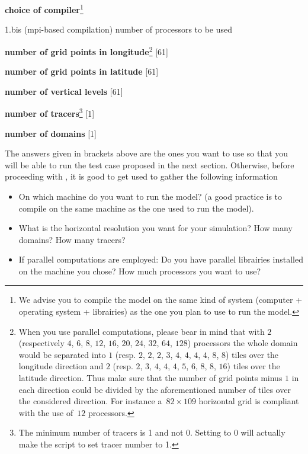 \mk
\begin{asparaenum}[1.]%
\item \textbf{choice of compiler}\footnote{We advise you to compile the model on the same kind of system (computer + operating system + librairies) as the one you plan to use to run the model.} 
\item[1.bis] (mpi-based compilation) number of processors to be used
\item \textbf{number of grid points in longitude}\footnote{When you use parallel computations, please bear in mind that with $2$ (respectively $4$, $6$, $8$, $12$, $16$, $20$, $24$, $32$, $64$, $128$) processors the whole domain would be separated into $1$ (resp. $2$, $2$, $2$,  $3$,  $4$,  $4$,  $4$,  $4$,  $8$,   $8$) tiles over the longitude direction and $2$ (resp. $2$, $3$, $4$,  $4$,  $4$,  $5$,  $6$,  $8$,  $8$,  $16$) tiles over the latitude direction. Thus make sure that the number of grid points minus $1$ in each direction could be divided by the aforementioned number of tiles over the considered direction. For instance a~$82 \times 109$ horizontal grid is compliant with the use of~$12$ processors.} [61]
\item \textbf{number of grid points in latitude} [61]
\item \textbf{number of vertical levels} [61] 
\item \textbf{number of tracers}\footnote{The minimum number of tracers is 1 and not 0. Setting to 0 will actually make the script to set tracer number to 1.} [1]
\item \textbf{number of domains} [1]
\end{asparaenum}

\sk
The answers given in brackets above are the ones you want to use so that you will be able to run the test case proposed in the next section. Otherwise, before proceeding with , it is good to get used to gather the following information
\begin{itemize}
\item On which machine do you want to run the model? (a good practice is to compile on the same machine as the one used to run the model).
\item What is the horizontal resolution you want for your simulation? How many domains? How many tracers?
\item If parallel computations are employed: Do you have parallel librairies installed on the machine you chose? How much processors you want to use? 
\end{itemize}

